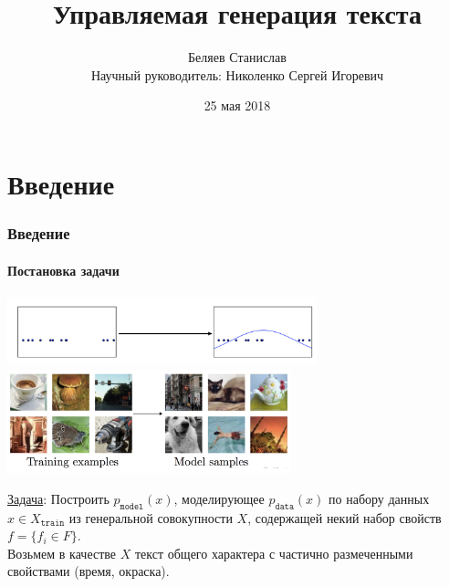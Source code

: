 \documentclass[10pt]{beamer}
\title[Управляемая генерация текста]{Управляемая генерация текста%
}
\author[Беляев Станислав]{
Беляев Станислав\texorpdfstring{\\ Научный руководитель: Николенко Сергей Игоревич}{}
}
\institute[СПбАУ]
{
Санкт-Петербургский Академический Университет \\
\medskip
\textit{stasbelyaev96@gmail.com}
}
\date{25 мая 2018}
\begin{document}
\begin{frame}
\titlepage
\end{frame}
\section{Введение}
\begin{frame}
\frametitle{Введение}
\framesubtitle{Постановка задачи}

\begin{center}
    \includegraphics[height=2cm]{images/density_estimation.png}\\
    \includegraphics[height=3cm]{images/density_samples.png}
\end{center}

\underline{Задача}: Построить $p_{\texttt{model}}(x)$, моделирующее $p_{\texttt{data}}(x)$ по набору данных $x \in X_{\texttt{train}}$ из генеральной совокупности $X$, содержащей некий набор свойств $f = \{f_i \in F\}$. \\
Возьмем в качестве $X$ текст общего характера с частично размеченными свойствами (время, окраска). %

\end{frame}
\end{document}
